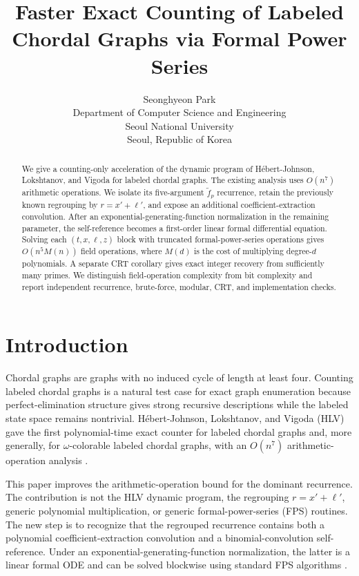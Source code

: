 \documentclass[10pt]{article}
\title{Faster Exact Counting of Labeled Chordal Graphs via Formal Power Series}
\author{Seonghyeon Park\\Department of Computer Science and Engineering\\Seoul National University\\Seoul, Republic of Korea}
\date{}
\begin{document}
\maketitle

\begin{abstract}
We give a counting-only acceleration of the dynamic program of Hébert-Johnson, Lokshtanov, and Vigoda for labeled chordal graphs. The existing analysis uses $O(n^7)$ arithmetic operations. We isolate its five-argument $\widetilde f_p$ recurrence, retain the previously known regrouping by $r=x'+\ell'$, and expose an additional coefficient-extraction convolution. After an exponential-generating-function normalization in the remaining parameter, the self-reference becomes a first-order linear formal differential equation. Solving each $(t,x,\ell,z)$ block with truncated formal-power-series operations gives $O(n^5M(n))$ field operations, where $M(d)$ is the cost of multiplying degree-$d$ polynomials. A separate CRT corollary gives exact integer recovery from sufficiently many primes. We distinguish field-operation complexity from bit complexity and report independent recurrence, brute-force, modular, CRT, and implementation checks.
\end{abstract}

\linenumbers
\section{Introduction}
Chordal graphs are graphs with no induced cycle of length at least four. Counting labeled chordal graphs is a natural test case for exact graph enumeration because perfect-elimination structure gives strong recursive descriptions while the labeled state space remains nontrivial. Hébert-Johnson, Lokshtanov, and Vigoda (HLV) gave the first polynomial-time exact counter for labeled chordal graphs and, more generally, for $\omega$-colorable labeled chordal graphs, with an $O(n^7)$ arithmetic-operation analysis \cite{hlv}.

This paper improves the arithmetic-operation bound for the dominant recurrence. The contribution is not the HLV dynamic program, the regrouping $r=x'+\ell'$, generic polynomial multiplication, or generic formal-power-series (FPS) routines. The new step is to recognize that the regrouped recurrence contains both a polynomial coefficient-extraction convolution and a binomial-convolution self-reference. Under an exponential-generating-function normalization, the latter is a linear formal ODE and can be solved blockwise using standard FPS algorithms \cite{brentkung}.
\end{document}
